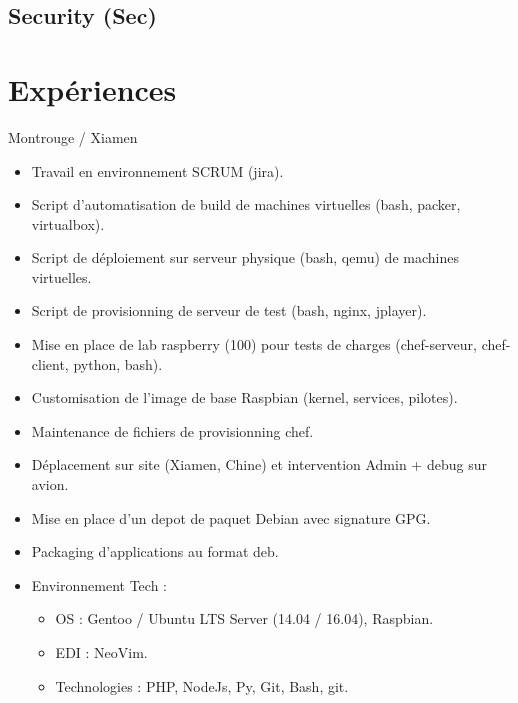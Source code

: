 \documentclass[10pt,a4paper,sans]{moderncv}
\begin{document}
\subsection{Security (Sec)}

\section{Expériences}

{Montrouge / Xiamen}{
  \begin{itemize}%
    \item Travail en environnement SCRUM (jira).
    \item Script d'automatisation de build de machines virtuelles (bash, packer, virtualbox).
    \item Script de déploiement sur serveur physique (bash, qemu) de machines virtuelles.
    \item Script de provisionning de serveur de test (bash, nginx, jplayer).
    \item Mise en place de lab raspberry (100) pour tests de charges (chef-serveur, chef-client, python, bash).
    \item Customisation de l'image de base Raspbian (kernel, services, pilotes).
    \item Maintenance de fichiers de provisionning chef.
    \item Déplacement sur site (Xiamen, Chine) et intervention Admin + debug sur avion.
    \item Mise en place d'un depot de paquet Debian avec signature GPG.
    \item Packaging d'applications au format deb.
    \item Environnement Tech :
      \begin{itemize}%
        \item OS : Gentoo / Ubuntu LTS Server (14.04 / 16.04), Raspbian.
        \item EDI : NeoVim.
        \item Technologies : PHP, NodeJs, Py, Git, Bash, git.
      \end{itemize}
  \end{itemize}}
\end{document}
